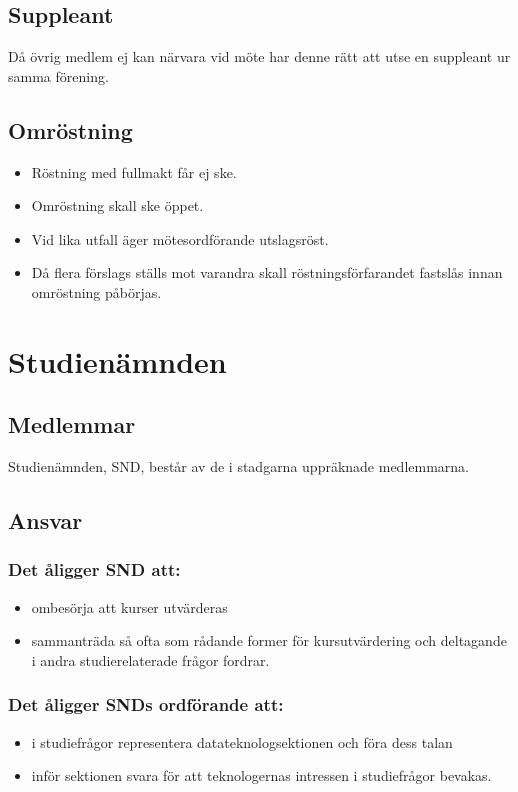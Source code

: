 \documentclass[a4paper, 10pt]{article}
\begin{document}
\subsection{Suppleant} 
Då övrig medlem ej kan närvara vid möte har denne rätt att utse en suppleant ur samma förening. 
\subsection{Omröstning} 
\begin{itemize}
  \item Röstning med fullmakt får ej ske. 
  \item Omröstning skall ske öppet. 
  \item Vid lika utfall äger mötesordförande utslagsröst. 
  \item Då flera förslags ställs mot varandra skall röstningsförfarandet fastslås innan omröstning påbörjas.
\end{itemize}
\newpage
\section{Studienämnden}
\subsection{Medlemmar}
Studienämnden, SND, består av de i stadgarna uppräknade medlemmarna.
\subsection{Ansvar}
\subsubsection{Det åligger SND att:}
\begin{itemize}
  \item ombesörja att kurser utvärderas
  \item sammanträda så ofta som rådande former för kursutvärdering och deltagande i andra studierelaterade frågor fordrar.
\end{itemize}
\subsubsection{Det åligger SNDs ordförande att:}
\begin{itemize}
  \item i studiefrågor representera datateknologsektionen och föra dess talan
  \item inför sektionen svara för att teknologernas intressen i studiefrågor bevakas.
\end{itemize}
\end{document}
